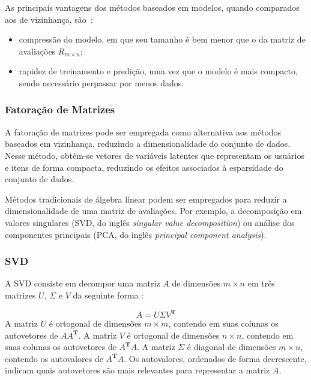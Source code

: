 As principais vantagens dos métodos baseados em modelos, quando comparados aos de vizinhança, são~\cite{aggarwal2016recommender}:
\begin{itemize}
    \item compressão do modelo, em que seu tamanho é bem menor que o da matriz de avaliações $R_{m \times n}$;
    \item rapidez de treinamento e predição, uma vez que o modelo é mais compacto, sendo necessário perpassar por menos dados.
\end{itemize}

\subsubsection{Fatoração de Matrizes}
A fatoração de matrizes pode ser empregada como alternativa aos métodos baseados
em vizinhança, reduzindo a dimensionalidade do conjunto de dados. Nesse método,
obtém-se vetores de variáveis latentes que representam os usuários e itens de
forma compacta, reduzindo os efeitos associados à esparsidade do conjunto de
dados.

Métodos tradicionais de álgebra linear podem ser empregados para reduzir a
dimensionalidade de uma matriz de avaliações. Por exemplo, a decomposição em
valores singulares (SVD, do inglês \textit{singular value decomposition}) ou
análise dos componentes principais (PCA, do inglês \textit{principal component
analysis}).

\subsubsection{SVD}
A SVD consiste em decompor uma matriz $A$ de dimensões $m \times n$ em três
matrizes $U$, $\Sigma$ e $V$ da seguinte forma \cite{strang2006linear}:

\begin{equation}
    A = U \Sigma V^{\mathbf{T}}
    \label{eq:SVD}
\end{equation}
A matriz $U$ é ortogonal de dimensões $m \times m$, contendo em suas colunas
os autovetores de $AA^{\mathbf{T}}$. A matriz $V$ é ortogonal de dimensões $n
\times n$, contendo em suas colunas os autovetores de $A^{\mathbf{T}}A$. A
matriz $\Sigma$ é diagonal de dimensões $m \times n$, contendo os  autovalores
de $A^{\mathbf{T}}A$. Os autovalores, ordenados de forma decrescente, indicam
quais autovetores são mais relevantes para representar a matriz $A$.

